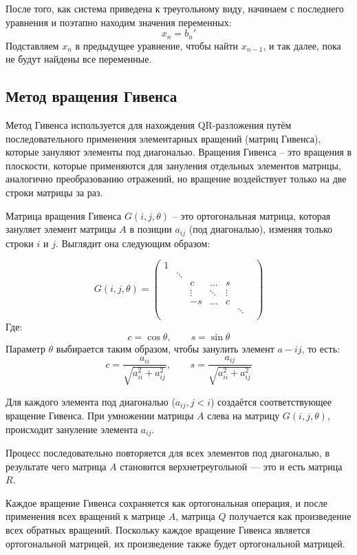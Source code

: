 \documentclass[12pt, a4paper]{article}
\begin{document}
	После того, как система приведена к треугольному виду, начинаем с последнего уравнения и поэтапно находим значения переменных:
	$$x_n = b_n'$$
	Подставляем $x_n$ в предыдущее уравнение, чтобы найти $x_{n-1}$, и так далее, пока не будут найдены все переменные.
	
	\subsection{Метод вращения Гивенса}
	
	Метод Гивенса используется для нахождения QR-разложения путём последовательного применения элементарных вращений (матриц Гивенса), которые зануляют элементы под диагональю. Вращения Гивенса -- это вращения в плоскости, которые применяются для зануления отдельных элементов матрицы, аналогично преобразованию отражений, но вращение воздействует только на две строки матрицы за раз.
	
	Матрица вращения Гивенса $G(i,j,\theta)$ -- это ортогональная матрица, которая зануляет элемент матрицы $A$ в позиции $a_{ij}$ (под диагональю), изменяя только строки $i$ и $j$. Выглядит она следующим образом:
	
	\begin{equation*}
		G(i, j, \theta) =
		\begin{pmatrix}
			1 & & & & & \\
			& \ddots & & & & \\
			& & c & \dots & s & \\
			& & \vdots & \ddots & \vdots & \\
			& & -s & \dots & c & \\
			& & & & & \ddots & \\
		\end{pmatrix}
	\end{equation*}
	Где:
	$$c=\cos\theta, \qquad s=\sin\theta$$
	Параметр $\theta$ выбирается таким образом, чтобы занулить элемент $a-{ij}$, то есть:
	$$c=\frac{a_{ii}}{\sqrt{a_{ii}^2+a_{ij}^2}}, \qquad s=\frac{a_{ij}}{\sqrt{a_{ii}^2+a_{ij}^2}}$$
	
	Для каждого элемента под диагональю ($a_{ij},j<i$) создаётся соответствующее вращение Гивенса. При умножении матрицы $A$ слева на матрицу $G(i,j,\theta)$, происходит зануление элемента $a_{ij}$.

	Процесс последовательно повторяется для всех элементов под диагональю, в результате чего матрица $A$ становится верхнетреугольной — это и есть матрица $R$.
	
	Каждое вращение Гивенса сохраняется как ортогональная операция, и после применения всех вращений к матрице $A$, матрица $Q$ получается как произведение всех обратных вращений. Поскольку каждое вращение Гивенса является ортогональной матрицей, их произведение также будет ортогональной матрицей.
	
\end{document}
